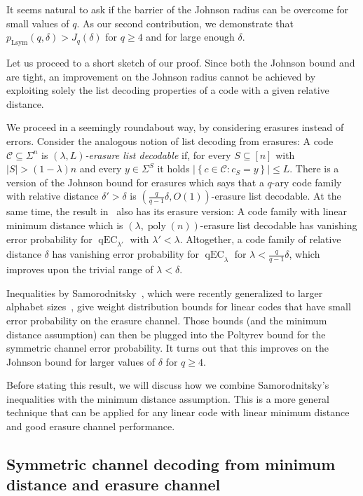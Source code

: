 \documentclass{article}
\DeclareMathOperator{\qEC}{qEC}
\DeclareMathOperator{\poly}{poly}
\newcommand{\cC}{\mathcal{C}}
\newcommand{\pLsym}{p_{\mathrm{Lsym}}}
\theoremstyle{plain}
\theoremstyle{plain}
\theoremstyle{plain}
\theoremstyle{plain}
\theoremstyle{plain}
\theoremstyle{plain}
\theoremstyle{plain}
\theoremstyle{plain}
\theoremstyle{plain}
\theoremstyle{plain}
\theoremstyle{remark}
\theoremstyle{remark}
\theoremstyle{remark}
\theoremstyle{plain}
\begin{document}
It seems natural to ask if the barrier
of the Johnson radius can be overcome
for small values of $q$.
As our second contribution, we demonstrate that
$\pLsym(q,\delta)>J_q(\delta)$ for $q\ge 4$
and for large enough $\delta$.

Let us proceed to a short sketch of our proof.
Since both the Johnson bound and 
are tight, an improvement on the Johnson radius
cannot be achieved by exploiting solely the list
decoding properties of a code with a given relative distance. 

We proceed in a seemingly roundabout way,
by considering erasures instead of errors.
Consider the analogous notion of list decoding from erasures:
A code $\cC\subseteq\Sigma^n$ is 
\emph{$(\lambda,L)$-erasure list decodable} if,
for every $S\subseteq[n]$ with $|S|> (1-\lambda)n$
and every $y\in\Sigma^S$ it holds
$\left|\left\{c\in \cC:c_S=y\right\}\right|\le L$.
There is a version of the Johnson bound for erasures
which says that a $q$-ary code family with relative distance $\delta'>\delta$
is 
$\left(\frac{q}{q-1}\delta,O(1)\right)$-erasure list decodable.
At the same time, the result in~\cite{pernice2025list}
also has its erasure version: A code family with linear minimum
distance which
is $(\lambda,\poly(n))$-erasure list decodable has vanishing error probability
for $\qEC_{\lambda'}$ with $\lambda'<\lambda$.
Altogether, a code family of relative distance $\delta$
has vanishing error probability for $\qEC_\lambda$
for $\lambda<\frac{q}{q-1}\delta$, which improves upon the trivial
range of $\lambda<\delta$.

Inequalities by Samorodnitsky~\cite{samorodnitsky2019upper,samorodnitsky2020improved},
which were recently generalized to larger alphabet sizes~\cite{abawonse2025generalized},
give weight distribution bounds for linear codes
that have small error probability on the
erasure channel. Those bounds (and the minimum distance assumption)
can then be plugged into the Poltyrev bound 
for the symmetric channel error probability.
It turns out that this improves on the Johnson
bound for larger values of $\delta$ for $q\ge 4$.

Before stating this result, we will discuss how we combine Samorodnitsky's inequalities
with the minimum distance assumption. This is
a more general technique that can be applied for
any linear code with linear minimum distance and
good erasure channel performance.

\subsection{Symmetric channel decoding from
minimum distance and erasure channel}
\label{sec:intro-sam}
\end{document}

